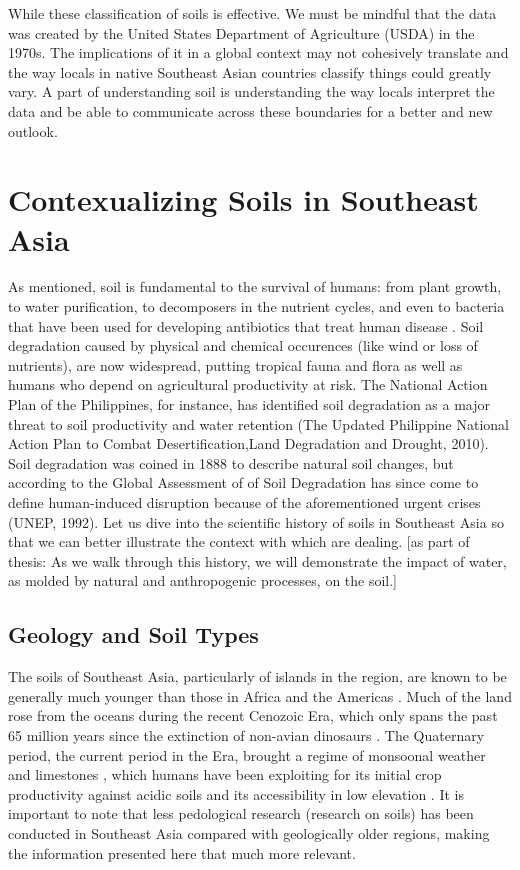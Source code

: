 While these classification of soils is effective. We must be mindful that the data was created by the United States Department of Agriculture (USDA) in the 1970s. The implications of it in a global context may not cohesively translate and the way locals in native Southeast Asian countries classify things could greatly vary. A part of understanding soil is understanding the way locals interpret the data and be able to communicate across these boundaries for a better and new outlook.


\section{Contexualizing Soils in Southeast Asia}

As mentioned, soil is fundamental to the survival of humans: from plant growth, to water purification, to decomposers in the nutrient cycles, and even to bacteria that have been used for developing antibiotics that treat human disease \citep{asio2006morphology}. Soil degradation caused by physical and chemical occurences (like wind or loss of nutrients), are now widespread, putting tropical fauna and flora as well as humans who depend on agricultural productivity at risk. The National Action Plan of the Philippines, for instance, has identified soil degradation as a major threat to soil productivity and water retention (The Updated Philippine National Action Plan to Combat Desertification,Land Degradation and Drought, 2010). Soil degradation was coined in 1888 to describe natural soil changes, but according to the Global Assessment of of Soil Degradation has since come to define human-induced disruption because of the aforementioned urgent crises (UNEP, 1992). Let us dive into the scientific history of soils in Southeast Asia so that we can better illustrate the context with which are dealing. [as part of thesis: As we walk through this history, we will demonstrate the impact of water, as molded by natural and anthropogenic processes, on the soil.]

\subsection{Geology and Soil Types}
The soils of Southeast Asia, particularly of islands in the region, are known to be generally much younger than those in Africa and the Americas \citep{juo2003tropical}. Much of the land rose from the oceans during the recent Cenozoic Era, which only spans the past 65 million years since the extinction of non-avian dinosaurs \citep{hall2002cenozoic}. The Quaternary period, the current period in the Era, brought a regime of monsoonal weather and limestones \citep{verstappen1997effect}, which humans have been exploiting for its initial crop productivity against acidic soils and its accessibility in low elevation \citep{asio2006morphology}. It is important to note that less pedological research (research on soils) has been conducted in Southeast Asia compared with geologically older regions, making the information presented here that much more relevant. 

